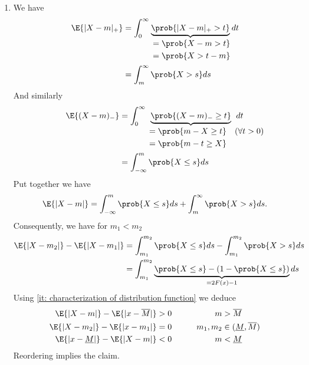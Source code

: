 \begin{solution}
\begin{enumerate}[wide=0pt]
    \item[\ref{it: (median) projection in L1}]
    We have
    \begin{align*}
        \E{\abs{X-m}_+}
        &= \int_0^\infty \underbrace{\prob{\abs{X-m}_+ > t}}_{
            \begin{aligned}
                &=\prob{X-m>t}\\
                &=\prob{X> t-m}
            \end{aligned}
        } dt\\
        &= \int_m^\infty \prob{X>s}ds
    \end{align*}
    And similarly
    \begin{align*}
        \E{(X-m)_-}
        &= \int_0^\infty \underbrace{\prob{(X-m)_- \ge t}}_{
            \begin{aligned}
                &=\prob{m-X\ge t} \quad \mathrlap{(\forall t>0)}\\
                &=\prob{m-t\ge X}
            \end{aligned}
        } dt\\
        &= \int_{-\infty}^m \prob{X\le s}ds
    \end{align*}
    Put together we have
    \[
        \E{\abs{X-m}}
        = \int_{-\infty}^m \prob{X\le s}ds + \int_m^\infty \prob{X>s}ds.
    \]
    Consequently, we have for \(m_1 < m_2\)
    \[\begin{aligned}
        \E{\abs{X-m_2}} - \E{\abs{X-m_1}}
        &= \int_{m_1}^{m_2} \prob{X\le s}ds - \int_{m_1}^{m_2} \prob{X>s}ds
        \\
        &= \int_{m_1}^{m_2} \underbrace{\prob{X\le s} - (1-\prob{X\le s})}_{=2F(x) -1}ds
    \end{aligned}
    \]
    Using \ref{it: characterization of distribution function} we deduce
    \begin{alignat*}{3}
        \E{\abs{X-m}} - \E{\abs{x-\overline{M}}} &> 0
        & m &> \overline{M} 
        \\
        \E{\abs{X-m_2}} - \E{\abs{x-m_1}} &= 0
        \qquad & m_1, m_2 &\in (\underline{M}, \overline{M})
        \\
        \E{\abs{x-\underline{M}}} - \E{\abs{X-m}} &< 0
        & m &< \underline{M}
    \end{alignat*}
    Reordering implies the claim. \qedhere
\end{enumerate}
\end{solution}
